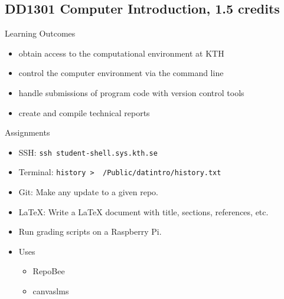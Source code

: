 \subsection{DD1301 Computer Introduction, 1.5 credits}

\begin{frame}[fragile]
  \begin{block}{Learning Outcomes}
    \begin{itemize}
      \item<1> obtain access to the computational environment at KTH
      \item<2> control the computer environment via the command line
      \item<3> handle submissions of program code with version control tools
      \item<4> create and compile technical reports
    \end{itemize}
  \end{block}

  \begin{block}{Assignments}
    \begin{itemize}
      \item<1> SSH: \texttt{ssh student-shell.sys.kth.se}
      \item<2> Terminal: \texttt{history > ~/Public/datintro/history.txt}
      \item<3> Git: Make any update to a given repo.
      \item<4> LaTeX: Write a LaTeX document with title, sections, references, 
        etc.
    \end{itemize}
  \end{block}
\end{frame}

\begin{frame}[fragile]
  \begin{example}[Grading]
    \begin{itemize}
      \item Run grading scripts on a Raspberry Pi.
      \item Uses
        \begin{itemize}
          \item RepoBee
          \item canvaslms
        \end{itemize}
    \end{itemize}
  \end{example}
\end{frame}

